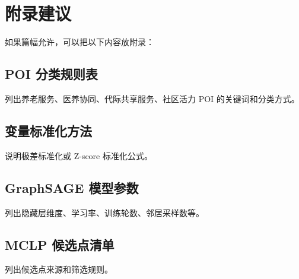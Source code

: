 \section{附录建议}

如果篇幅允许，可以把以下内容放附录：

\subsection{POI 分类规则表}

列出养老服务、医养协同、代际共享服务、社区活力 POI 的关键词和分类方式。

\subsection{变量标准化方法}

说明极差标准化或 Z-score 标准化公式。

\subsection{GraphSAGE 模型参数}

列出隐藏层维度、学习率、训练轮数、邻居采样数等。

\subsection{MCLP 候选点清单}

列出候选点来源和筛选规则。

